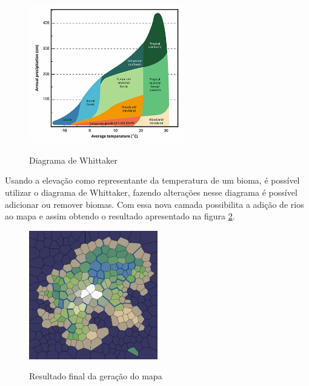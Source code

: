 \begin{figure}[ht]
	\caption{Diagrama de Whittaker}
	\centering
	\includegraphics[width=0.6\textwidth]{figures/diagrama-whittaker.png}
	\label{fig:diagrama-whittaker}
\end{figure}

Usando a elevação como representante da temperatura de um bioma, é possível utilizar o diagrama de Whittaker, fazendo alterações nesse diagrama é possível adicionar ou remover biomas. Com essa nova camada possibilita a adição de rios ao mapa \cite{amitp2010} e assim obtendo o resultado apresentado na figura \ref{fig:biomes}.

\begin{figure}[ht]
	\caption{Resultado final da geração do mapa}
	\centering
	\includegraphics[width=0.5\textwidth]{figures/biomes.png}
	\label{fig:biomes}
\end{figure}


